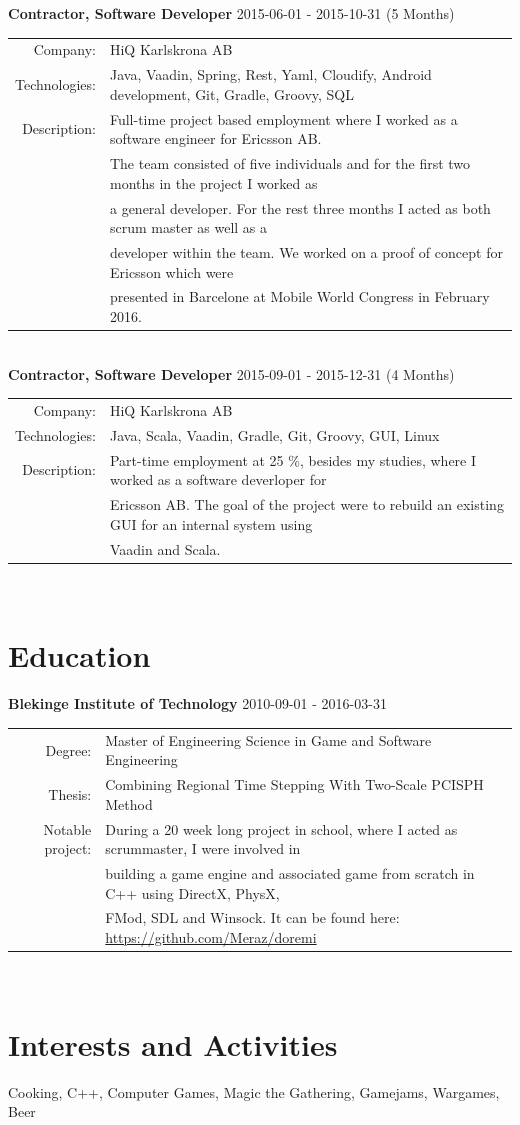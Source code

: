 \documentclass[a4paper,10pt]{article}
\begin{document}
\textbf{Contractor, Software Developer} 2015-06-01 - 2015-10-31 (5 Months)\\
\begin{tabular}{rl}
Company:& HiQ Karlskrona AB \\
Technologies:&  Java, Vaadin, Spring, Rest, Yaml, Cloudify, Android development, Git, Gradle, Groovy, SQL\\
Description:& Full-time project based employment where I worked as a software engineer for Ericsson AB.\\&
The team consisted of five individuals and for the first two months in the project I worked as\\&
a general developer. For the rest three months I acted as both scrum master as well as a\\&
developer within the team. We worked on a proof of concept for Ericsson which were\\& 
presented in Barcelone at Mobile World Congress in February 2016.\\
\end{tabular}\\

\textbf{Contractor, Software Developer} 2015-09-01 - 2015-12-31 (4 Months) \\
\begin{tabular}{rl}
Company:& HiQ Karlskrona AB \\
Technologies:&  Java, Scala, Vaadin, Gradle, Git, Groovy, GUI, Linux\\
Description:& Part-time employment at 25 \%, besides my studies, where I worked as a software deverloper for\\&
Ericsson AB. The goal of the project were to rebuild an existing GUI for an internal system using\\&
Vaadin and Scala.
\end{tabular}\\

\section{Education}
\textbf{Blekinge Institute of Technology} 2010-09-01 - 2016-03-31 \\
\begin{tabular}{rl}
Degree:&  Master of Engineering Science in Game and Software Engineering\\
Thesis:& Combining Regional Time Stepping With Two-Scale PCISPH Method\\
Notable project:& During a 20 week long project in school, where I acted as scrummaster, I were involved in\\&
building a game engine and  associated game from scratch in C++ using DirectX, PhysX,\\&
FMod, SDL and Winsock. It can be found here: \url{https://github.com/Meraz/doremi}
\end{tabular}\\

\section{Interests and Activities}
Cooking, C++, Computer Games, Magic the Gathering, Gamejams, Wargames, Beer
\end{document}
